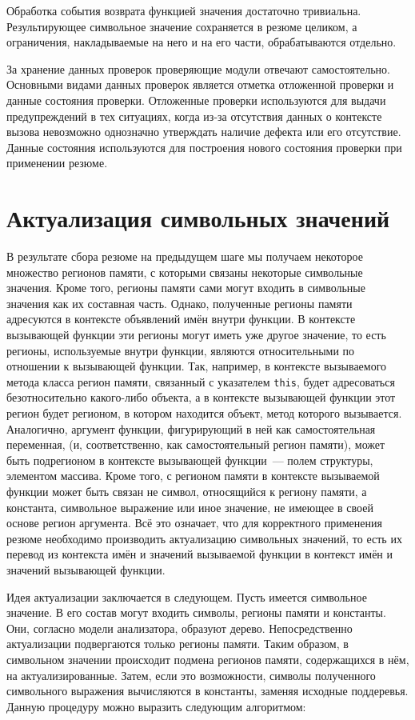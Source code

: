 Обработка события возврата функцией значения достаточно тривиальна. Результирующее символьное значение сохраняется в резюме целиком, а ограничения, накладываемые на него и на его части, обрабатываются отдельно.

За хранение данных проверок проверяющие модули отвечают самостоятельно. Основными видами данных проверок является отметка отложенной проверки и данные состояния проверки. Отложенные проверки используются для выдачи предупреждений в тех ситуациях, когда из-за отсутствия данных о контексте вызова невозможно однозначно утверждать наличие дефекта или его отсутствие. Данные состояния используются для построения нового состояния проверки при применении резюме. 

\section{Актуализация символьных значений}

В результате сбора резюме на предыдущем шаге мы получаем некоторое множество регионов памяти, с которыми связаны некоторые символьные значения. Кроме того, регионы памяти сами могут входить в символьные значения как их составная часть. Однако, полученные регионы памяти адресуются в контексте объявлений имён внутри функции. В контексте вызывающей функции эти регионы могут иметь уже другое значение, то есть регионы, используемые внутри функции, являются относительными по отношении к вызывающей функции. Так, например, в контексте вызываемого метода класса регион памяти, связанный с указателем \texttt{this}, будет адресоваться безотносительно какого-либо объекта, а в контексте вызывающей функции этот регион будет регионом, в котором находится объект, метод которого вызывается. Аналогично, аргумент функции, фигурирующий в ней как самостоятельная переменная, (и, соответственно, как самостоятельный регион памяти), может быть подрегионом в контексте вызывающей функции~--- полем структуры, элементом массива. Кроме того, с регионом памяти в контексте вызываемой функции может быть связан не символ, относящийся к региону памяти, а константа, символьное выражение или иное значение, не имеющее в своей основе регион аргумента. Всё это означает, что для корректного применения резюме необходимо производить актуализацию символьных значений, то есть их перевод из контекста имён и значений вызываемой функции в контекст имён и значений вызывающей функции.

Идея актуализации заключается в следующем. Пусть имеется символьное значение. В его состав могут входить символы, регионы памяти и константы. Они, согласно модели анализатора, образуют дерево. Непосредственно актуализации подвергаются только регионы памяти. Таким образом, в символьном значении происходит подмена регионов памяти, содержащихся в нём, на актуализированные. Затем, если это возможности, символы полученного символьного выражения вычисляются в константы, заменяя исходные поддеревья. Данную процедуру можно выразить следующим алгоритмом:


